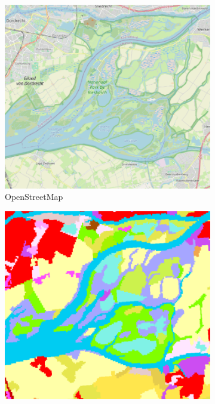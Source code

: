         \begin{figure}[H]
        \centering
    
        \begin{subfigure}[b]{0.48\textwidth}
        \centering
        \includegraphics[width=1\linewidth,height=\linewidth]{figs_01/biesbosch_osm.png}
        \caption{OpenStreetMap}
        \label{fig:biesbosch_osm}
        \end{subfigure}
        \hfill %
        \begin{subfigure}[b]{0.48\textwidth}
        \centering
        \includegraphics[width=1\linewidth,height=\linewidth]{figs_01/biesbosch_clc.png}

\end{subfigure}
\end{figure}
